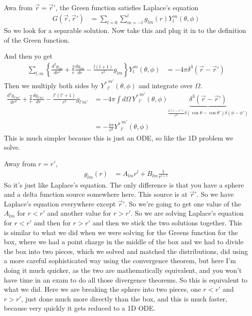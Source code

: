 Awa from $\vec{r}=\vec{r}'$,
the Green function satisfies Laplace's equation
\begin{align}
    G\left( \vec{r}, \vec{r}' \right)
    &=
    \sum_{l=0}
    \sum_{m=-l}^{l}
    g_{lm}\left( r \right)
    Y_{l}^{\,m}\left( \theta, \phi \right)
\end{align}
So we look for a separable solution.
Now take this and plug it in to the definition of the Green function.

And then yo get
\begin{align}
    \sum_{l,m}
    \left\{ 
    \frac{d^2 g_{lm}}{dr^2}
    +
    \frac{2}{r}
    \frac{dg_{lm}}{dr}
    -
    \frac{l(l + 1)}{r^2}g_{lm}
    \right\}
    Y_{l}^{\,m}\left( \theta, \phi \right)
    &=
    -4\pi \delta^3 \left( \vec{r} - \vec{r}' \right)
\end{align}
Then we multiply both sides by ${Y^*}_{l'}^{\, m'}\left( \theta, \phi \right)$
and integrate over $\Omega$.
\begin{align}
    \frac{d^2 g_{l'm'}}{dr^2}
    +
    \frac{2}{r} \frac{dg_{l'm'}}{dr}
    -
    \frac{l'\left( l' + 1 \right)}{r^2} g_{l'm'}
    &=
    -4\pi
    \int d\Omega\,
    {Y^*}_{l'}^{\,m'}\left( \theta, \phi \right)
    \underbrace{\delta^3\left( \vec{r} - \vec{r}' \right)}_{
    \frac{\delta\left( r - r' \right)}{r^2}
    \delta\left( \cos\theta - \cos\theta' \right)
    \delta\left( \phi - \phi' \right)
    }\\
    &=
    -\frac{4\pi}{r^2}
    {Y^*}_{l'}^{\,m'}\left( \theta, \phi \right)
\end{align}
This is much simpler because this is just an ODE,
so like the 1D problem we solve.

Away from $r=r'$,
\begin{align}
    g_{lm}\left( r \right)
    &=
    A_{lm} r^l + B_{lm} \frac{1}{r^{l + 1}}
\end{align}
So it's just like Laplace's equation.
The only difference is that you have a sphere and a delta function source
somewhere here.
This source is at $\vec{r}'$.
So we have Laplace's equation everywhere except $\vec{r}'$.
So we're going to get one value of the $A_{lm}$ for $r<r'$
and another value for $r>r'$.
So we are solving Laplace's equation for $r<r'$ and then for $r>r'$
and then we stick the two solutions together.
This is similar to what we did when we were solving for the Greens function for
the box,
where we had a point charge in the middle of the box and we had to divide the
box into two pieces,
which we solved and matched the distributions,
did using a more careful sophisticated way using the convergence theorem,
but here I'm doing it much quicker,
as the two are mathematically equivalent,
and you won't have time in an exam to do all those divergence theorems.
So this is equivalent to what we did.
Here we are breaking the sphere into two pieces,
one $r<r'$ and $r>r'$,
just done much more directly than the box,
and this is much faster,
because very quickly it gets reduced to a 1D ODE.

